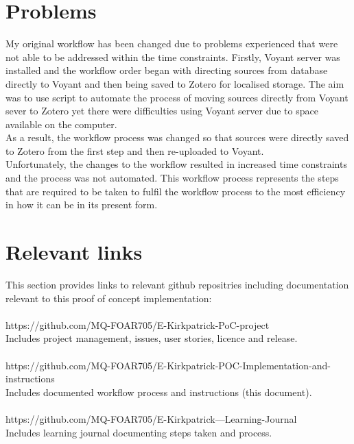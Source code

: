 \documentclass{article}
\begin{document}
\section{Problems}
My original workflow has been changed due to problems experienced that were not able to be addressed within the time constraints. Firstly, Voyant server was installed and the workflow order began with directing sources from database directly to Voyant and then being saved to Zotero for localised storage. The aim was to use script to automate the process of moving sources directly from Voyant sever to Zotero yet there were difficulties using Voyant server due to space available on the computer.\\
As a result, the workflow process was changed so that sources were directly saved to Zotero from the first step and then re-uploaded to Voyant. \\
Unfortunately, the changes to the workflow resulted in increased time constraints and the process was not automated. This workflow process represents the steps that are required to be taken to fulfil the workflow process to the most efficiency in how it can be in its present form.

\section{Relevant links}
This section provides links to relevant github repositries including documentation relevant to this proof of concept implementation:\\
\\
https://github.com/MQ-FOAR705/E-Kirkpatrick-PoC-project\\
Includes project management, issues, user stories, licence and release.\\
\\
https://github.com/MQ-FOAR705/E-Kirkpatrick-POC-Implementation-and-instructions\\
Includes documented workflow process and instructions (this document).\\
\\
https://github.com/MQ-FOAR705/E-Kirkpatrick---Learning-Journal\\
Includes learning journal documenting steps taken and process.
\end{document}
